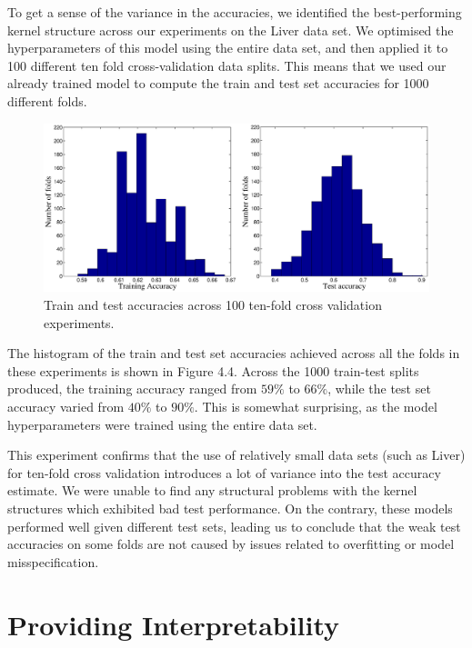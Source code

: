 \documentclass[a4paper,12pt ]{report}
\newcommand{\kerntimes}{ \! \times \!}
\newcommand{\kernplus}{ \, + \,}
\begin{document}
To get a sense of the variance in the accuracies, we identified the best-performing kernel structure across our experiments on the Liver data set. We optimised the hyperparameters of this model using the entire data set, and then applied it to 100 different ten fold cross-validation data splits. This means that we used our already trained model to compute the train and test set accuracies for 1000 different folds.


\begin{figure} [ht!]
\caption{Train and test accuracies across 100 ten-fold cross validation experiments. }
\begin{center}
\includegraphics[trim=0cm 0cm 0cm 0cm, width=1\textwidth] {figures/overfitwithlargelength.eps}
\end{center}
\end{figure}


The histogram of the train and test set accuracies achieved across all the folds in these experiments is shown in Figure 4.4. Across the 1000 train-test splits produced, the training accuracy ranged from $59\%$ to $66\%$, while the test set accuracy varied from $40\%$ to $90\%$. This is somewhat surprising, as the model hyperparameters were trained using the entire data set.

This experiment confirms that the use of relatively small data sets (such as Liver) for ten-fold cross validation introduces a lot of variance into the test accuracy estimate. We were unable to find any structural problems with the kernel structures which exhibited bad test performance. On the contrary, these models performed well given different test sets, leading us to conclude that the weak test accuracies on some folds are not caused by issues related to overfitting or model misspecification.

\section{Providing Interpretability}
\end{document}
